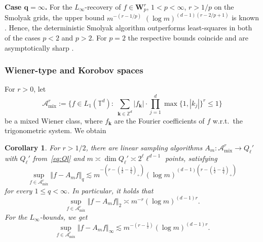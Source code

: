 \documentclass[a4paper,12pt]{amsart}
\newtheorem{corollary}[theorem]{Corollary}
\theoremstyle{definition}
\theoremstyle{remark}
\newcommand{\abs}[1]{\left|#1\right|}
\newcommand{\bk}{\mathbf{k}}
\newcommand{\mix}{\ensuremath{\mathrm{mix}}}
\begin{document}
{{{\bf Case $\boldsymbol{q=\infty}$.}
 For the $L_\infty$-recovery of
   $f\in \mathbf{W}^r_p$, $1<p<\infty$, $r>1/p$ on the Smolyak grids, the upper bound
    $m^{-(r-1/p)}$ $(\log m)^{(d-1)(r-2/p+1)}$ is known \cite[Cor.\ 7.8]{Byrenheid_Ullrich2017}.
Hence, the deterministic Smolyak algorithm outperforms least-squares %
in both of the cases $p<2$ and $p>2$. For $p=2$ the respective bounds coincide and are asymptotically sharp \cite{Tem93}. 
   
}

\medskip







\subsubsection{Wiener-type and Korobov spaces}

For $r>0$, let
$$
\mathcal{A}^r_{\mix} := \Big\{ f\in L_1(\mathbb{T}^d) 
\colon \; \sum_{\bk \in \mathbb{Z}^d} \abs{f_{\bk}} \cdot \prod_{j=1}^{d}\max \{1,  \abs{k_j}\}^{r}  \le1 \Big\}
$$
be a mixed Wiener class,
where $f_{\bk}$ are the Fourier coefficients of $f$ w.r.t.\ the trigonometric system.
We obtain 
\begin{corollary}\label{estim_Wiener_linear}
	For $r>1/2$, there are linear sampling algorithms $A_m \colon \mathcal{A}^r_{\mix} \to Q_\ell'$ with 
	$Q_\ell'$ from~\eqref{eq:Ql} and $m \asymp \dim Q_\ell' \asymp 2^\ell \ell^{d-1}$ 
     {points,}
    satisfying 
	$$
	\sup_{ f \in {\mathcal{A}^r_{\mix}}} \Vert f - A_m f  \Vert_q
	\lesssim 
	m^{-(r - (\frac12-\frac{1}{q})_+)} {(\log m)^{(d-1)(r- (\frac12-\frac{1}{q})_+ %
	)}}
	$$
	for every
	{$1\leq q < \infty$.
In particular, 
	it 
     {holds that}
$$
	\sup_{f \in {\mathcal{A}^r_{\mix}}} \Vert f - A_m f  \Vert_2
 	\asymp 
	m^{-r} (\log m)^{(d-1)r}.
	$$
For the $L_\infty$-bounds,	we get
$$
	\sup_{f \in {\mathcal{A}^r_{\mix}}} \Vert f - A_m f  \Vert_\infty 
 	\lesssim 
	m^{-(r - \frac{1}{2})} (\log m)^{(d-1)r}.
$$}
\end{corollary}



}
\end{document}
